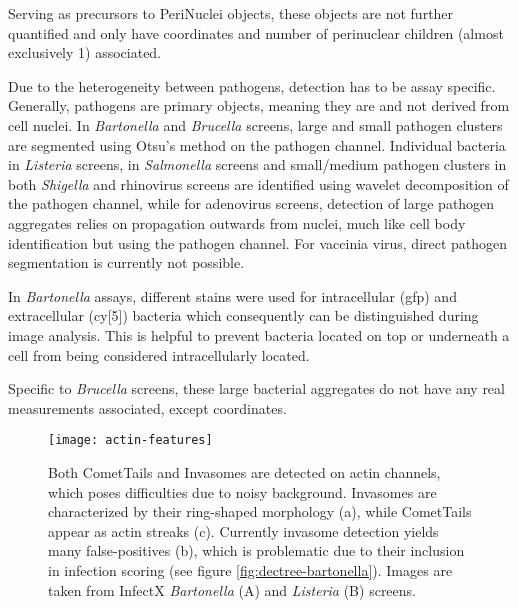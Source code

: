 \begin{description}[leftmargin=0.5cm]
\item[ExpandedNuclei:] Serving as precursors to PeriNuclei objects, these objects are not further quantified and only have coordinates and number of perinuclear children (almost exclusively 1) associated.
\item[Bacteria/Viruses/Pathogen:] Due to the heterogeneity between pathogens, detection has to be assay specific. Generally, pathogens are primary objects, meaning they are and not derived from cell nuclei. In \textit{Bartonella} and \textit{Brucella} screens, large and small pathogen clusters are segmented using Otsu's method on the pathogen channel. Individual bacteria in \textit{Listeria} screens,  in \textit{Salmonella} screens and small\slash medium pathogen clusters in both \textit{Shigella} and rhinovirus screens are identified using wavelet decomposition of the pathogen channel, while for adenovirus screens, detection of large pathogen aggregates relies on propagation outwards from nuclei, much like cell body identification but using the pathogen channel. For vaccinia virus, direct pathogen segmentation is currently not possible.
\item[IntBacteria/ExtBacteria:] In \textit{Bartonella} assays, different stains were used for intracellular (\acrshort{gfp}) and extracellular (\acrshort{cy}[5]) bacteria which consequently can be distinguished during image analysis. This is helpful to prevent bacteria located on top or underneath a cell from being considered intracellularly located.
\item[BlobBacteria:] Specific to \textit{Brucella} screens, these large bacterial aggregates do not have any real measurements associated, except coordinates.

\begin{figure}
  \centering
  \texttt{[image: actin-features]}
  \caption[Detection of two actin based structures, CometTails and Invasomes.]{Both CometTails and Invasomes are detected on actin channels, which poses difficulties due to noisy background. Invasomes are characterized by their ring-shaped morphology (a), while CometTails appear as actin streaks (c). Currently invasome detection yields many false-positives (b), which is problematic due to their inclusion in infection scoring (see figure \ref{fig:dectree-bartonella}). Images are taken from InfectX \textit{Bartonella} (A) and \textit{Listeria} (B) screens.}
  \label{fig:actin-features}
\end{figure}


\end{description}

